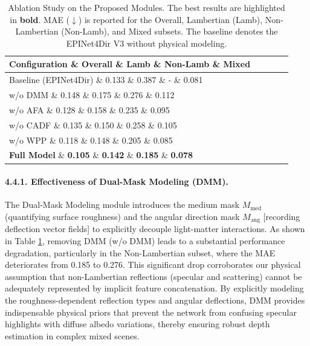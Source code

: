 \begin{table}[htbp]
\centering
\caption{Ablation Study on the Proposed Modules. The best results are highlighted in \textbf{bold}. MAE ($\downarrow$) is reported for the Overall, Lambertian (Lamb), Non-Lambertian (Non-Lamb), and Mixed subsets. The baseline denotes the EPINet4Dir V3 without physical modeling.}
\label{tab:ablation}
\renewcommand{\arraystretch}{1.2}
\begin{tabular}{lcccc}
\toprule
\textbf{Configuration} \& \textbf{Overall} \& \textbf{Lamb} \& \textbf{Non-Lamb} \& \textbf{Mixed} \\
\midrule
Baseline (EPINet4Dir) \& 0.133 \& 0.387 \& - \& 0.081 \\
\midrule
w/o DMM \& 0.148 \& 0.175 \& 0.276 \& 0.112 \\
w/o AFA \& 0.128 \& 0.158 \& 0.235 \& 0.095 \\
w/o CADF \& 0.135 \& 0.150 \& 0.258 \& 0.105 \\
w/o WPP \& 0.118 \& 0.148 \& 0.205 \& 0.085 \\
\midrule
\textbf{Full Model} \& \textbf{0.105} \& \textbf{0.142} \& \textbf{0.185} \& \textbf{0.078} \\
\bottomrule
\end{tabular}
\end{table}

\paragraph{4.4.1. Effectiveness of Dual-Mask Modeling (DMM).}
The Dual-Mask Modeling module introduces the medium mask $M_{\text{med}}$ (quantifying surface roughness) and the angular direction mask $M_{\text{ang}}$  [recording deflection vector fields] to explicitly decouple light-matter interactions. As shown in Table \ref{tab:ablation}, removing DMM (w/o DMM) leads to a substantial performance degradation, particularly in the Non-Lambertian subset, where the MAE deteriorates from 0.185 to 0.276. This significant drop corroborates our physical assumption that non-Lambertian reflections (specular and scattering) cannot be adequately represented by implicit feature concatenation. By explicitly modeling the roughness-dependent reflection types and angular deflections, DMM provides indispensable physical priors that prevent the network from confusing specular highlights with diffuse albedo variations, thereby ensuring robust depth estimation in complex mixed scenes.


